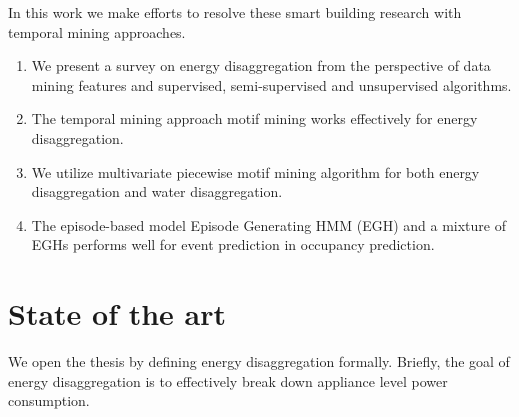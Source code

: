 In this work we make efforts to resolve these smart building research with 
temporal mining approaches.
\begin{enumerate}
	\item We present a survey on energy disaggregation from the perspective of data mining features and supervised, semi-supervised and unsupervised algorithms. 
	\item The temporal mining approach motif mining works effectively for energy disaggregation. 
	\item We utilize multivariate piecewise motif mining algorithm for both energy disaggregation and water disaggregation. 
	\item The episode-based model Episode Generating HMM (EGH) and a mixture of EGHs performs well for event prediction in occupancy prediction. 
\end{enumerate}
\section{State of the art}
We open the thesis by defining energy disaggregation formally. Briefly, the goal of energy disaggregation is to effectively break down appliance level power consumption. 





